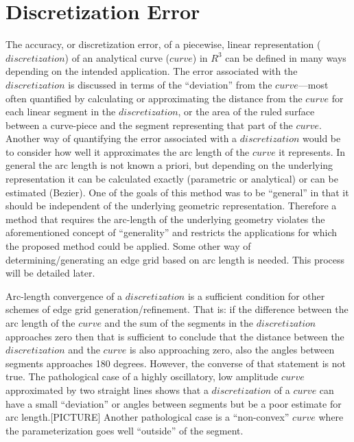\section{Discretization Error}
The accuracy, or discretization error, of a piecewise, linear representation ($discretization$) of an analytical curve ($curve$) in $R^3$ can be defined in many ways depending on the intended application.  The error associated with the $discretization$ is discussed in terms of the ``deviation'' from the $curve$—most often quantified by calculating or approximating the distance from the $curve$ for each linear segment in the $discretization$, or the area of the ruled surface between a curve-piece and the segment representing that part of the $curve$.  Another way of quantifying the error associated with a $discretization$ would be to consider how well it approximates the arc length of the $curve$ it represents.  In general the arc length is not known a priori, but depending on the underlying representation it can be calculated exactly (parametric or analytical) or can be estimated (Bezier).  One of the goals of this method was to be “general” in that it should be independent of the underlying geometric representation.  Therefore a method that requires the arc-length of the underlying geometry violates the aforementioned concept of “generality” and restricts the applications for which the proposed method could be applied.  Some other way of determining/generating an edge grid based on arc length is needed.  This process will be detailed later.

Arc-length convergence of a $discretization$ is a sufficient condition for other schemes of edge grid generation/refinement.  That is: if the difference between the arc length of the $curve$ and the sum of the segments in the $discretization$ approaches zero then that is sufficient to conclude that the distance between the $discretization$ and the $curve$ is also approaching zero, also the angles between segments approaches 180 degrees.  However, the converse of that statement is not true.  The pathological case of a highly oscillatory, low amplitude $curve$ approximated by two straight lines shows that a $discretization$ of a $curve$ can have a small ``deviation'' or angles between segments but be a poor estimate for arc length.[PICTURE]  Another pathological case is a ``non-convex'' $curve$ where the parameterization goes well ``outside'' of the segment.


